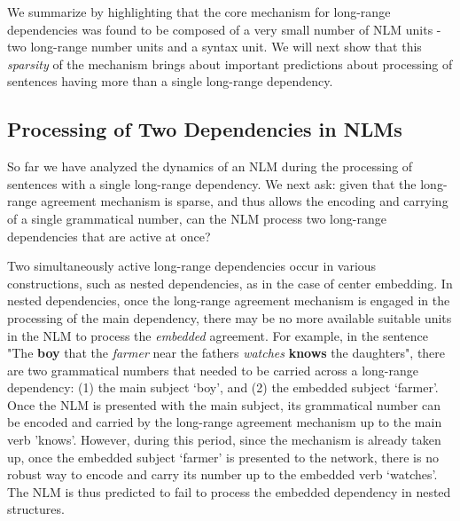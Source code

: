 \vspace{10pt}

We summarize by highlighting that the core mechanism for long-range dependencies was found to be composed of a very small number of NLM units - two long-range number units and a syntax unit. We will next show that this \textit{sparsity} of the mechanism brings about important predictions about processing of sentences having more than a single long-range dependency.

\subsection{Processing of Two Dependencies in NLMs}
So far we have analyzed the dynamics of an NLM during the processing of sentences with a single long-range dependency. We next ask: given that the long-range agreement mechanism is sparse, and thus allows the encoding and carrying of a single grammatical number, can the NLM process two long-range dependencies that are active at once?

Two simultaneously active long-range dependencies occur in various constructions, such as nested dependencies, as in the case of center embedding. In nested dependencies, once the long-range agreement mechanism is engaged in the processing of the main dependency, there may be no more available suitable units in the NLM to process the \textit{embedded} agreement. For example, in the sentence "The \textbf{boy} that the \textit{farmer} near the fathers \textit{watches} \textbf{knows} the daughters", there are two grammatical numbers that needed to be carried across a long-range dependency: (1) the main subject `boy', and (2) the embedded subject `farmer'. Once the NLM is presented with the main subject, its grammatical number can be encoded and carried by the long-range agreement mechanism up to the main verb 'knows'. However, during this period, since the mechanism is already taken up, once the embedded subject `farmer' is presented to the network, there is no robust way to encode and carry its number up to the embedded verb `watches'. The NLM is thus predicted to fail to process the embedded dependency in nested structures.

